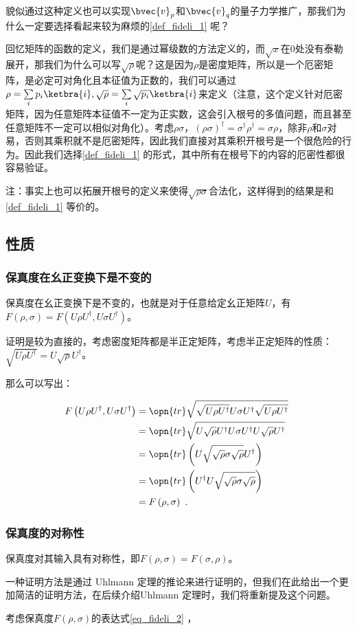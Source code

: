 貌似通过这种定义也可以实现$\bvec{v}_p$和$\bvec{v}_q$的量子力学推广，那我们为什么一定要选择看起来较为麻烦的\autoref{def_fideli_1} 呢？

回忆矩阵的函数的定义，我们是通过幂级数的方法定义的，而$\sqrt{x}$在$0$处没有泰勒展开，那我们为什么可以写$\sqrt{\rho}$呢？这是因为$\rho$是密度矩阵，所以是一个厄密矩阵，是必定可对角化且本征值为正数的，我们可以通过$\rho = \sum\limits_ip_i\ketbra{i},\sqrt{\rho} = \sum\limits_i\sqrt{p_i}\ketbra{i}$来定义（注意，这个定义针对厄密矩阵，因为任意矩阵本征值不一定为正实数，这会引入根号的多值问题，而且甚至任意矩阵不一定可以相似对角化）。考虑$\rho\sigma$，$\left(\rho\sigma\right)^\dagger = \sigma^\dagger \rho^\dagger = \sigma\rho$，除非$\rho$和$\sigma$对易，否则其乘积就不是厄密矩阵，因此我们直接对其乘积开根号是一个很危险的行为。因此我们选择\autoref{def_fideli_1} 的形式，其中所有在根号下的内容的厄密性都很容易验证。

注：事实上也可以拓展开根号的定义来使得$\sqrt{\rho\sigma}$合法化，这样得到的结果是和\autoref{def_fideli_1} 等价的。

\subsection{性质}

\subsubsection{保真度在幺正变换下是不变的}

保真度在幺正变换下是不变的，也就是对于任意给定幺正矩阵$U$，有$F\left(\rho,\sigma\right) = F\left(U \rho U^\dagger, U\sigma U^\dagger\right)$。

证明是较为直接的，考虑密度矩阵都是半正定矩阵，考虑半正定矩阵的性质：$\sqrt{U \rho U^\dagger} = U \sqrt{\rho} U^\dagger$。

那么可以写出：

\begin{equation}
\begin{aligned}
F\left(U \rho U^\dagger, U \sigma U^\dagger\right) &= \opn{tr}\sqrt{\sqrt{U \rho U^\dagger}U \sigma U^\dagger \sqrt{U \rho U^\dagger}} \\
&= \opn{tr}\sqrt{U\sqrt{\rho}U^\dagger U \sigma U^\dagger U \sqrt{\rho}U^\dagger} \\
&= \opn{tr}\left(U\sqrt{\sqrt{\rho}\sigma\sqrt{\rho}}U^\dagger\right) \\
&= \opn{tr}\left(U^\dagger U \sqrt{\sqrt{\rho}\sigma\sqrt{\rho}}\right) \\
&= F\left(\rho, \sigma\right)~.
\end{aligned}~
\end{equation}

\subsubsection{保真度的对称性}

保真度对其输入具有对称性，即$F\left(\rho,\sigma\right) = F\left(\sigma,\rho\right)$。

一种证明方法是通过 Uhlmann 定理的推论来进行证明的，但我们在此给出一个更加简洁的证明方法，在后续介绍Uhlmann 定理时，我们将重新提及这个问题。 

考虑保真度$F\left(\rho,\sigma\right)$的表达式\autoref{eq_fideli_2} ，
